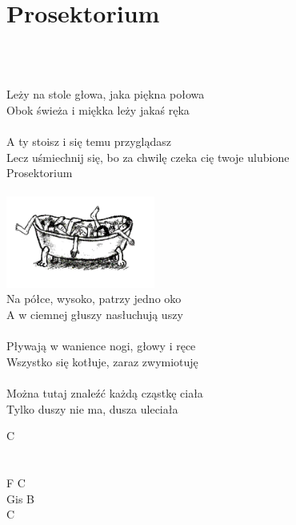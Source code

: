 \documentclass[a5paper, 10pt]{book}
\begin{document}
\section{Prosektorium}\textcolor{lightgray}{\textit{}}\\~\\
\begin{minipage}[t]{0.75\textwidth}
Leży na stole głowa, jaka piękna połowa\\
Obok świeża i miękka leży jakaś ręka\\
\\
\hspace*{5mm}A ty stoisz i się temu przyglądasz\\
\hspace*{5mm}Lecz uśmiechnij się, bo za chwilę czeka cię twoje ulubione\\
\hspace*{5mm}Prosektorium\\
\\
\hspace*{7cm}\includegraphics[height=3cm]{images/prosektorium.png}\vspace*{-3.05cm}\\
Na półce, wysoko, patrzy jedno oko\\
A w ciemnej głuszy nasłuchują uszy\\
\\
Pływają w wanience nogi, głowy i ręce\\
Wszystko się kotłuje, zaraz zwymiotuję\\
\\
Można tutaj znaleźć każdą cząstkę ciała\\
Tylko duszy nie ma, dusza uleciała\\
\end{minipage}
\begin{minipage}[t]{0.25\textwidth}
C\\
\\
\\
F C\\
Gis B\\
C\\
\\
\end{minipage}
\end{document}
